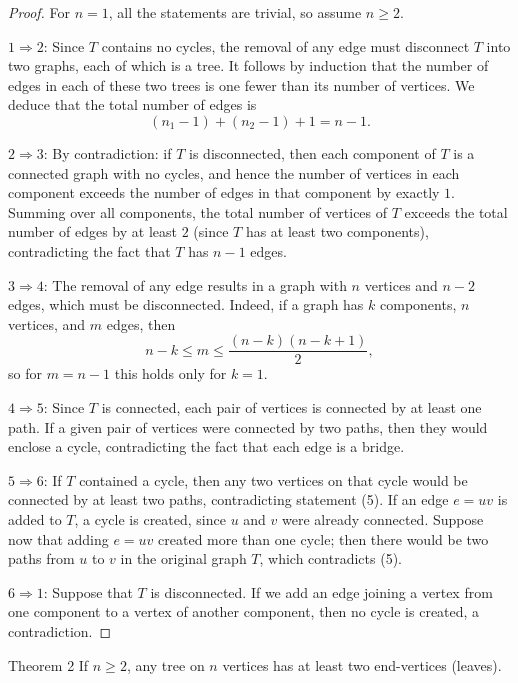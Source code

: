\documentclass[11pt]{scrartcl}
\theoremstyle{plain}
\theoremstyle{remark}
\begin{document}
\begin{proof}
For $n=1$, all the statements are trivial, so assume $n \geq 2$.

\smallskip
\noindent $1 \Rightarrow 2$: Since $T$ contains no cycles, the removal of any edge must disconnect $T$ into two graphs, each of which is a tree. It follows by induction that the number of edges in each of these two trees is one fewer than its number of vertices. We deduce that the total number of edges is
$$(n_1 - 1) + (n_2 - 1) + 1 = n - 1.$$

\smallskip
\noindent $2 \Rightarrow 3$: By contradiction: if $T$ is disconnected, then each component of $T$ is a connected graph with no cycles, and hence the number of vertices in each component exceeds the number of edges in that component by exactly $1$. Summing over all components, the total number of vertices of $T$ exceeds the total number of edges by at least $2$ (since $T$ has at least two components), contradicting the fact that $T$ has $n-1$ edges.

\smallskip
\noindent $3 \Rightarrow 4$: The removal of any edge results in a graph with $n$ vertices and $n-2$ edges, which must be disconnected. Indeed, if a graph has $k$ components, $n$ vertices, and $m$ edges, then
$$n-k \leq m \leq \frac{(n-k)(n-k+1)}{2},$$
so for $m = n-1$ this holds only for $k=1$.

\smallskip
\noindent $4 \Rightarrow 5$: Since $T$ is connected, each pair of vertices is connected by at least one path. If a given pair of vertices were connected by two paths, then they would enclose a cycle, contradicting the fact that each edge is a bridge.

\smallskip
\noindent $5 \Rightarrow 6$: If $T$ contained a cycle, then any two vertices on that cycle would be connected by at least two paths, contradicting statement (5). If an edge $e = uv$ is added to $T$, a cycle is created, since $u$ and $v$ were already connected. Suppose now that adding $e = uv$ created more than one cycle; then there would be two paths from $u$ to $v$ in the original graph $T$, which contradicts (5).

\smallskip
\noindent $6 \Rightarrow 1$: Suppose that $T$ is disconnected. If we add an edge joining a vertex from one component to a vertex of another component, then no cycle is created, a contradiction.
\end{proof}

\begin{thmbox}{Theorem 2}
If $n \geq 2$, any tree on $n$ vertices has at least two end-vertices (leaves).
\end{thmbox}
\end{document}
